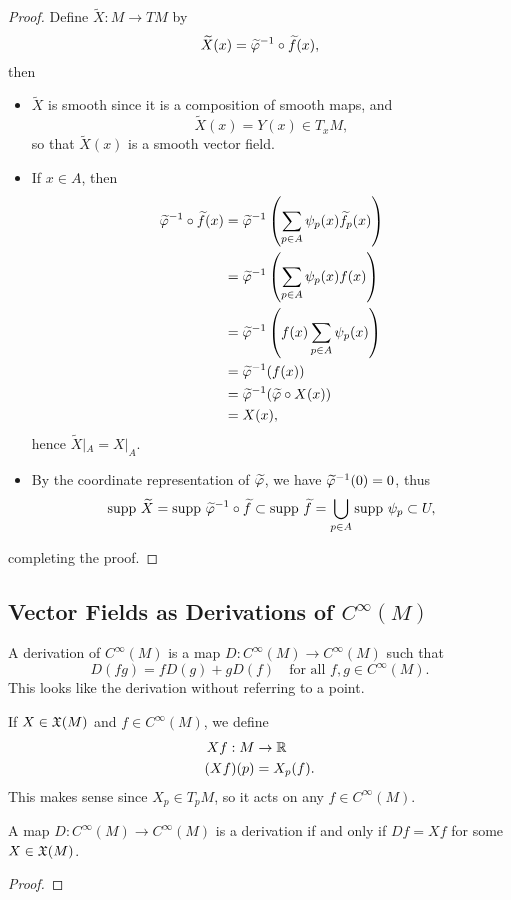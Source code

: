\begin{proof}
    Define $\widetilde{X}:M \to TM$ by 
    $$ \widetilde{X}(x) = \widetilde{\varphi}^{-1} \circ \widetilde{f}(x),$$
    then 
    \begin{itemize}
    \item $\widetilde{X}$ is smooth since it is a composition of smooth maps, and
    $$\widetilde{X}(x) = Y(x) \in T_x M, $$
    so that $\widetilde{X}(x)$ is a smooth vector field. 
    \item If $x \in A$, then 
    \begin{align*}
        \widetilde{\varphi}^{-1} \circ \widetilde{f}(x) 
        &= \widetilde{\varphi}^{-1}\left(\sum_{p \in A}\psi_p(x)\widetilde{f}_p(x)\right) \\
        &= \widetilde{\varphi}^{-1}\left(\sum_{p \in A}\psi_p(x) f(x)\right) \\
        &= \widetilde{\varphi}^{-1}\left(f(x) \sum_{p \in A}\psi_p(x)\right) \\
        &= \widetilde{\varphi}^{-1}(f(x)) \\
        &= \widetilde{\varphi}^{-1}(\widetilde{\varphi} \circ X(x)) \\
        &= X(x),
    \end{align*}
    hence $\widetilde{X}|_A = X|_A$.
    \item By the coordinate representation of $\widetilde{\varphi}$, we have $\widetilde{\varphi}^{-1}(0) = 0$, thus
    $$\mathrm{supp~} \widetilde{X} = \mathrm{supp~} \widetilde{\varphi}^{-1} \circ \widetilde{f} \subset \mathrm{supp~} \widetilde{f} = \bigcup_{p \in A}\mathrm{supp~} \psi_p \subset U, $$
    \end{itemize}
    completing the proof. 
\end{proof}

\subsection{Vector Fields as Derivations of $C^\infty(M)$}
A derivation of $C^\infty(M)$ is a map $D:C^\infty(M) \to C^\infty(M)$ such that 
$$D(fg) = fD(g) + gD(f) \quad \text{for all }f,g \in C^\infty(M). $$
This looks like the derivation without referring to a point. 

If $X \in \mathfrak{X}(M)$ and $f \in C^\infty(M)$, we define
\begin{align*}
    Xf:M &\to \mathbb{R} \\
    (Xf)(p) &= X_p(f).
\end{align*}
This makes sense since $X_p \in T_pM$, so it acts on any $f \in C^\infty(M)$. 

\begin{proposition}
    A map $D:C^\infty(M) \to C^\infty(M)$ is a derivation if and only if $Df = Xf$ for some $X \in \frak{X}(M)$. 
\end{proposition}
\begin{proof}
    
\end{proof}

